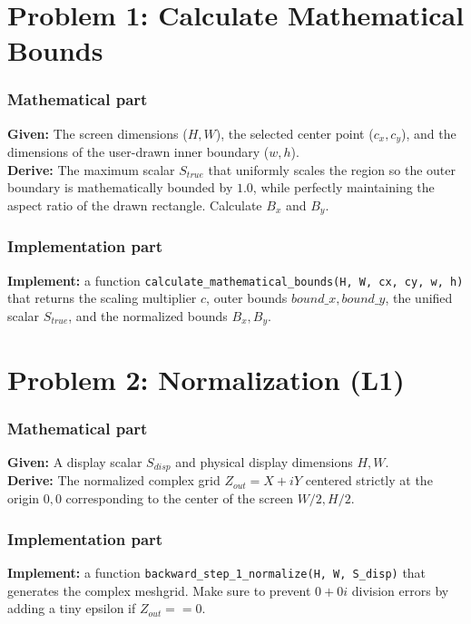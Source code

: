\documentclass[11pt]{article}
\begin{document}
\section*{Problem 1: Calculate Mathematical Bounds}

\subsubsection*{Mathematical part}
\textbf{Given:} The screen dimensions ($H, W$), the selected center point ($c_x, c_y$), and the dimensions of the user-drawn inner boundary ($w, h$). \\
\textbf{Derive:} The maximum scalar $S_{true}$ that uniformly scales the region so the outer boundary is mathematically bounded by $1.0$, while perfectly maintaining the aspect ratio of the drawn rectangle. Calculate $B_x$ and $B_y$.

\subsubsection*{Implementation part}
\textbf{Implement:} a function \lstinline|calculate_mathematical_bounds(H, W, cx, cy, w, h)| that returns the scaling multiplier $c$, outer bounds $bound\_x, bound\_y$, the unified scalar $S_{true}$, and the normalized bounds $B_x, B_y$.

\section*{Problem 2: Normalization (L1)}

\subsubsection*{Mathematical part}
\textbf{Given:} A display scalar $S_{disp}$ and physical display dimensions $H, W$. \\
\textbf{Derive:} The normalized complex grid $Z_{out} = X + iY$ centered strictly at the origin $0,0$ corresponding to the center of the screen $W/2, H/2$. 

\subsubsection*{Implementation part}
\textbf{Implement:} a function \lstinline|backward_step_1_normalize(H, W, S_disp)| that generates the complex meshgrid. Make sure to prevent $0+0i$ division errors by adding a tiny epsilon if $Z_{out} == 0$.
\end{document}

